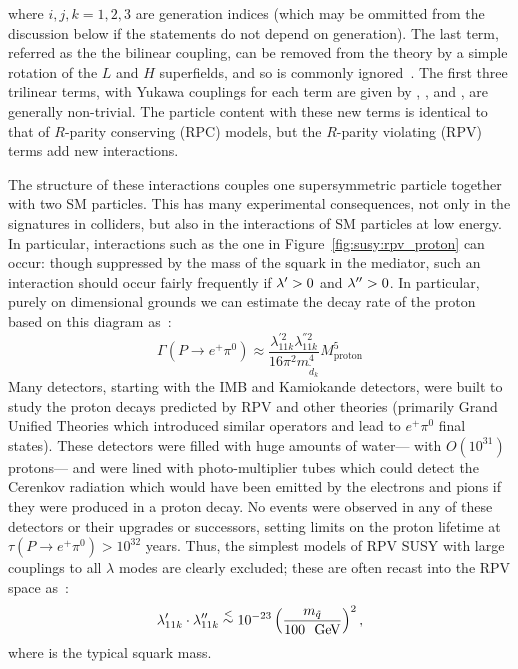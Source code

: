 \noindent where $i,j,k=1,2,3$ are generation indices (which may be ommitted from the discussion below if the statements do not depend on generation). The last term, referred as the the bilinear coupling, can be removed from the theory by a simple rotation of the $L$ and $H$ superfields, and so is commonly ignored~\cite{dreinerRPV}. The first three trilinear terms, with Yukawa couplings for each term are given by \lam, \lamp, and \lampp, are generally non-trivial. The particle content with these new terms is identical to that of $R$-parity conserving (RPC) models, but the $R$-parity violating (RPV) terms add new interactions.

The structure of these interactions couples one supersymmetric particle together with two SM particles. This has many experimental consequences, not only in the signatures in colliders, but also in the interactions of SM particles at low energy. In particular, interactions such as the one in Figure~\ref{fig:susy:rpv_proton} can occur: though suppressed by the mass of the squark in the mediator, such an interaction should occur fairly frequently if $\lambda^{\prime} > 0$ and $\lambda^{\prime\prime} > 0$. In particular, purely on dimensional grounds we can estimate the decay rate of the proton based on this diagram as~\cite{dreinerRPV}:
%
\begin{equation}
\Gamma(P\rightarrow e^+ \pi^0) \approx \frac{\lambda_{11k}^{'2} \lambda_{11k}^{''2}}{16\pi^2 m^4_{\tilde{d}_k}} M_\mathrm{proton}^5
\end{equation} 
%
Many detectors, starting with the IMB and Kamiokande detectors, were built to study the proton decays predicted by RPV and other theories (primarily Grand Unified Theories which introduced similar operators and lead to $e^+ \pi^0$ final states). These detectors were filled with huge amounts of water--- with $O(10^{31})$ protons--- and were lined with photo-multiplier tubes which could detect the Cerenkov radiation which would have been emitted by the electrons and pions if they were produced in a proton decay. No events were observed in any of these detectors or their upgrades or successors, setting limits on the proton lifetime at $\tau(P\rightarrow e^+ \pi^0) > 10^{32}$ years. Thus, the simplest models of RPV SUSY with large couplings to all $\lambda$ modes are clearly excluded; these are often recast into the RPV space as~\cite{PhysRevD.47.279}:
%
\begin{eqnarray}
  \lamp_{11k}\cdot\lampp_{11k}\; \lsim\; 10^{-23} \left( \frac{{\msquark}} {100~\gev} \right)^2,
  \label{eqn:rpvandudd:protondecay}
\end{eqnarray}
%
where \msquark is the typical squark mass. 

